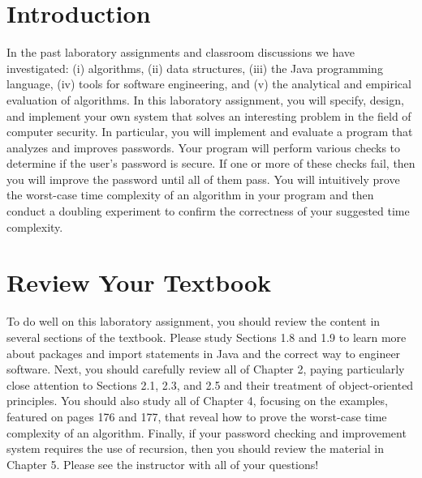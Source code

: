 

\usepackage[compact]{titlesec}


\section*{Introduction}

In the past laboratory assignments and classroom discussions we have investigated: (i) algorithms, (ii) data structures,
(iii) the Java programming language, (iv) tools for software engineering, and (v) the analytical and empirical
evaluation of algorithms. In this laboratory assignment, you will specify, design, and implement your own system that
solves an interesting problem in the field of computer security. In particular, you will implement and evaluate a
program that analyzes and improves passwords. Your program will perform various checks to determine if the user's
password is secure. If one or more of these checks fail, then you will improve the password until all of them pass. You
will intuitively prove the worst-case time complexity of an algorithm in your program and then conduct a doubling
experiment to confirm the correctness of your suggested time complexity.

\vspace*{-.05in}
\section*{Review Your Textbook}
\vspace*{-.05in}

To do well on this laboratory assignment, you should review the content in several sections of the textbook. Please
study Sections 1.8 and 1.9 to learn more about packages and import statements in Java and the correct way to engineer
software. Next, you should carefully review all of Chapter 2, paying particularly close attention to Sections 2.1, 2.3,
and 2.5 and their treatment of object-oriented principles. You should also study all of Chapter 4, focusing on the
examples, featured on pages 176 and 177, that reveal how to prove the worst-case time complexity of an algorithm.
Finally, if your password checking and improvement system requires the use of recursion, then you should review the
material in Chapter 5. Please see the instructor with all of your questions!

